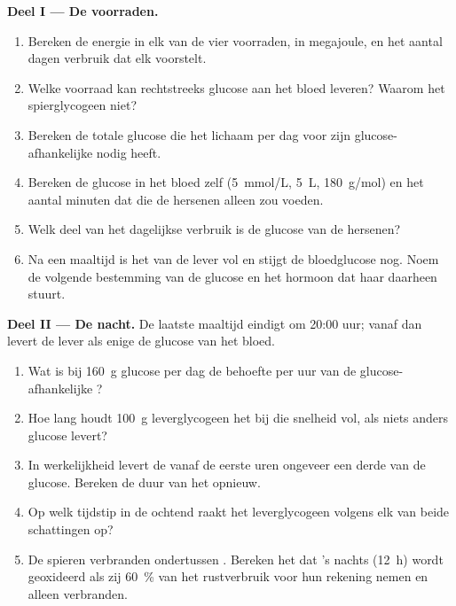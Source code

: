 \begin{problem}
\medskip
\noindent\textbf{Deel I --- De voorraden.}
\begin{enumerate}
  \item Bereken de energie in elk van de vier voorraden, in megajoule, en
        het aantal dagen verbruik dat elk voorstelt.
  \item Welke voorraad kan rechtstreeks glucose aan het bloed leveren?
        Waarom het spierglycogeen niet?
  \item Bereken de totale glucose die het lichaam per dag voor zijn
        glucose-afhankelijke  nodig heeft.
  \item Bereken de glucose in het bloed zelf (\qty{5}{mmol/L}, \qty{5}{L},
        \qty{180}{g/mol}) en het aantal minuten dat die de hersenen alleen
        zou voeden.
  \item Welk deel van het dagelijkse verbruik is de glucose van de
        hersenen?
  \item Na een maaltijd is het  van de lever vol en stijgt de
        bloedglucose nog. Noem de volgende bestemming van de glucose en
        het hormoon dat haar daarheen stuurt.
\end{enumerate}

\medskip
\noindent\textbf{Deel II --- De nacht.}
De laatste maaltijd eindigt om 20:00 uur; vanaf dan levert de lever als enige de
glucose van het bloed.
\begin{enumerate}[resume]
  \item Wat is bij \qty{160}{g} glucose per dag de behoefte per uur van de
        glucose-afhankelijke ?
  \item Hoe lang houdt \qty{100}{g} leverglycogeen het bij die snelheid
        vol, als niets anders glucose levert?
  \item In werkelijkheid levert de  vanaf de eerste uren
        ongeveer een derde van de glucose. Bereken de duur van het
         opnieuw.
  \item Op welk tijdstip in de ochtend raakt het leverglycogeen volgens
        elk van beide schattingen op?
  \item De spieren verbranden ondertussen . Bereken het  dat
        's nachts (\qty{12}{h}) wordt geoxideerd als zij \qty{60}{\%} van
        het rustverbruik voor hun rekening nemen en alleen  verbranden.
\end{enumerate}


\end{problem}
